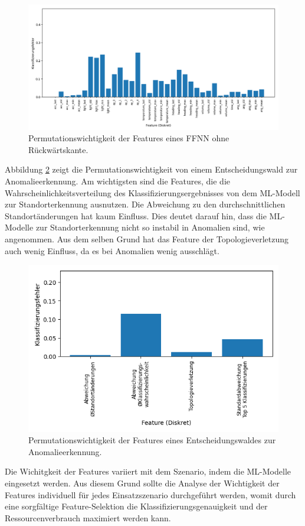 \begin{figure}[h!]
    \centering
    \includegraphics[width=\linewidth]{images/fi_wo_fe_knn.png}
    \caption{Permutationswichtigkeit der Features eines FFNN ohne Rückwärtskante.}
    \label{fig:feature_significance_knn_wo_fe}
\end{figure}
\newline
\newline
Abbildung \ref{fig:feature_significance_dt_anomaly} zeigt die Permutationswichtigkeit von einem Entscheidungswald zur Anomalieerkennung.
Am wichtigsten sind die Features, die die Wahrscheinlichkeitsverteilung des Klassifizierungsergebnisses von dem ML-Modell zur Standorterkennung ausnutzen.
Die Abweichung zu den durchschnittlichen Standortänderungen hat kaum Einfluss.
Dies deutet darauf hin, dass die ML-Modelle zur Standorterkennung nicht so instabil in Anomalien sind, wie angenommen.
Aus dem selben Grund hat das Feature der Topologieverletzung auch wenig Einfluss, da es bei Anomalien wenig ausschlägt.
\begin{figure}[h!]
    \centering
    \includegraphics[width=0.65\linewidth]{images/fi_anomaly_dt.png}
    \caption{Permutationswichtigkeit der Features eines Entscheidungswaldes zur Anomalieerkennung.}
    \label{fig:feature_significance_dt_anomaly}
\end{figure}
\newline
\newline
Die Wichitgkeit der Features variiert mit dem Szenario, indem die ML-Modelle eingesetzt werden.
Aus diesem Grund sollte die Analyse der Wichtigkeit der Features individuell für jedes Einsatzszenario durchgeführt werden,
womit durch eine sorgfältige Feature-Selektion die Klassifizierungsgenauigkeit und der Ressourcenverbrauch maximiert werden kann.